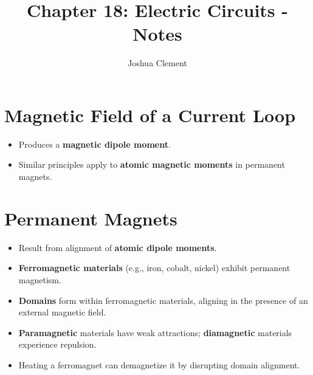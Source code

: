 \documentclass{article}
\begin{document}
\title{Chapter 18: Electric Circuits - Notes}
\author{Joshua Clement}
\maketitle

\section*{Magnetic Field of a Current Loop}
\begin{itemize}
    \item Produces a \textbf{magnetic dipole moment}.
    \item Similar principles apply to \textbf{atomic magnetic moments} in permanent magnets.
\end{itemize}

\section*{Permanent Magnets}
\begin{itemize}
    \item Result from alignment of \textbf{atomic dipole moments}.
    \item \textbf{Ferromagnetic materials} (e.g., iron, cobalt, nickel) exhibit permanent magnetism.
    \item \textbf{Domains} form within ferromagnetic materials, aligning in the presence of an external magnetic field.
    \item \textbf{Paramagnetic} materials have weak attractions; \textbf{diamagnetic} materials experience repulsion.
    \item Heating a ferromagnet can demagnetize it by disrupting domain alignment.
\end{itemize}
\end{document}
